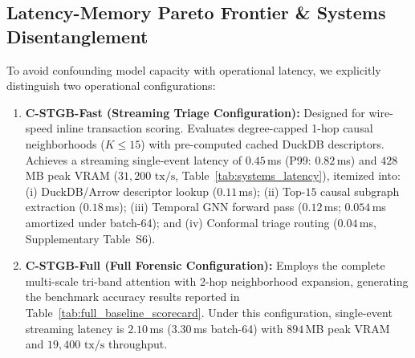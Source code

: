 \subsection{Latency-Memory Pareto Frontier \& Systems Disentanglement}
\label{sec:latency_results}
To avoid confounding model capacity with operational latency, we explicitly distinguish two operational configurations:
\begin{enumerate}[leftmargin=*]
    \item \textbf{C-STGB-Fast (Streaming Triage Configuration):} Designed for wire-speed inline transaction scoring. Evaluates degree-capped 1-hop causal neighborhoods ($K \le 15$) with pre-computed cached DuckDB descriptors. Achieves a streaming single-event latency of $0.45$\,ms (P99: $0.82$\,ms) and $428$\,MB peak VRAM ($31,200\text{ tx/s}$, Table~\ref{tab:systems_latency}), itemized into: (i) DuckDB/Arrow descriptor lookup ($0.11$\,ms); (ii) Top-$15$ causal subgraph extraction ($0.18$\,ms); (iii) Temporal GNN forward pass ($0.12$\,ms; $0.054$\,ms amortized under batch-64); and (iv) Conformal triage routing ($0.04$\,ms, Supplementary Table~S6).
    \item \textbf{C-STGB-Full (Full Forensic Configuration):} Employs the complete multi-scale tri-band attention with 2-hop neighborhood expansion, generating the benchmark accuracy results reported in Table~\ref{tab:full_baseline_scorecard}. Under this configuration, single-event streaming latency is $2.10$\,ms ($3.30$\,ms batch-64) with $894$\,MB peak VRAM and $19,400\text{ tx/s}$ throughput.
\end{enumerate}

\begin{table}[t]
\centering
\caption{Operational Systems Scaling and Latency Profile across Model Configurations on Benchmark Hardware.}
\label{tab:systems_latency}
\renewcommand{\arraystretch}{0.84}
\end{table}

